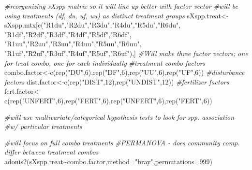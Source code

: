 \documentclass[
]{article}
\newenvironment{Shaded}{\begin{snugshade}}{\end{snugshade}}
\newcommand{\AttributeTok}[1]{\textcolor[rgb]{0.77,0.63,0.00}{#1}}
\newcommand{\CommentTok}[1]{\textcolor[rgb]{0.56,0.35,0.01}{\textit{#1}}}
\newcommand{\DecValTok}[1]{\textcolor[rgb]{0.00,0.00,0.81}{#1}}
\newcommand{\FunctionTok}[1]{\textcolor[rgb]{0.00,0.00,0.00}{#1}}
\newcommand{\NormalTok}[1]{#1}
\newcommand{\OtherTok}[1]{\textcolor[rgb]{0.56,0.35,0.01}{#1}}
\newcommand{\SpecialCharTok}[1]{\textcolor[rgb]{0.00,0.00,0.00}{#1}}
\newcommand{\StringTok}[1]{\textcolor[rgb]{0.31,0.60,0.02}{#1}}
\begin{document}
\begin{Shaded}
\begin{Highlighting}[]
\CommentTok{\#reorganizing sXspp matrix so it will line up better with factor vector}
\CommentTok{\#will be using treatments (df, du, uf, uu) as distinct treatment groups}
\NormalTok{sXspp.treat}\OtherTok{\textless{}{-}}\NormalTok{sXspp.mtx[}\FunctionTok{c}\NormalTok{(}\StringTok{"R1du"}\NormalTok{,}\StringTok{"R2du"}\NormalTok{,}\StringTok{"R3du"}\NormalTok{,}\StringTok{"R4du"}\NormalTok{,}\StringTok{"R5du"}\NormalTok{,}\StringTok{"R6du"}\NormalTok{,}
                         \StringTok{"R1df"}\NormalTok{,}\StringTok{"R2df"}\NormalTok{,}\StringTok{"R3df"}\NormalTok{,}\StringTok{"R4df"}\NormalTok{,}\StringTok{"R5df"}\NormalTok{,}\StringTok{"R6df"}\NormalTok{,}
                         \StringTok{"R1uu"}\NormalTok{,}\StringTok{"R2uu"}\NormalTok{,}\StringTok{"R3uu"}\NormalTok{,}\StringTok{"R4uu"}\NormalTok{,}\StringTok{"R5uu"}\NormalTok{,}\StringTok{"R6uu"}\NormalTok{,}
                         \StringTok{"R1uf"}\NormalTok{,}\StringTok{"R2uf"}\NormalTok{,}\StringTok{"R3uf"}\NormalTok{,}\StringTok{"R4uf"}\NormalTok{,}\StringTok{"R5uf"}\NormalTok{,}\StringTok{"R6uf"}\NormalTok{),]}
\CommentTok{\#Will make three factor vectors; one for treat combo, one for each individually}
\CommentTok{\#treatment combo factors}
\NormalTok{combo.factor}\OtherTok{\textless{}{-}}\FunctionTok{c}\NormalTok{(}\FunctionTok{rep}\NormalTok{(}\StringTok{"DU"}\NormalTok{,}\DecValTok{6}\NormalTok{),}\FunctionTok{rep}\NormalTok{(}\StringTok{"DF"}\NormalTok{,}\DecValTok{6}\NormalTok{),}\FunctionTok{rep}\NormalTok{(}\StringTok{"UU"}\NormalTok{,}\DecValTok{6}\NormalTok{),}\FunctionTok{rep}\NormalTok{(}\StringTok{"UF"}\NormalTok{,}\DecValTok{6}\NormalTok{))}
\CommentTok{\#disturbance factors}
\NormalTok{dist.factor}\OtherTok{\textless{}{-}}\FunctionTok{c}\NormalTok{(}\FunctionTok{rep}\NormalTok{(}\StringTok{"DIST"}\NormalTok{,}\DecValTok{12}\NormalTok{),}\FunctionTok{rep}\NormalTok{(}\StringTok{"UNDIST"}\NormalTok{,}\DecValTok{12}\NormalTok{))}
\CommentTok{\#fertilizer factors}
\NormalTok{fert.factor}\OtherTok{\textless{}{-}}\FunctionTok{c}\NormalTok{(}\FunctionTok{rep}\NormalTok{(}\StringTok{"UNFERT"}\NormalTok{,}\DecValTok{6}\NormalTok{),}\FunctionTok{rep}\NormalTok{(}\StringTok{"FERT"}\NormalTok{,}\DecValTok{6}\NormalTok{),}\FunctionTok{rep}\NormalTok{(}\StringTok{"UNFERT"}\NormalTok{,}\DecValTok{6}\NormalTok{),}\FunctionTok{rep}\NormalTok{(}\StringTok{"FERT"}\NormalTok{,}\DecValTok{6}\NormalTok{))}

\CommentTok{\#will use multivariate/categorical hypothesis tests to look for spp. association}
\CommentTok{\#w/ particular treatments}

\CommentTok{\#will focus on full combo treatments}
\CommentTok{\#PERMANOVA {-} does community comp. differ between treatment combos}
\FunctionTok{adonis2}\NormalTok{(sXspp.treat}\SpecialCharTok{\textasciitilde{}}\NormalTok{combo.factor,}\AttributeTok{method=}\StringTok{"bray"}\NormalTok{,}\AttributeTok{permutations=}\DecValTok{999}\NormalTok{)}
\end{Highlighting}
\end{Shaded}
\end{document}
